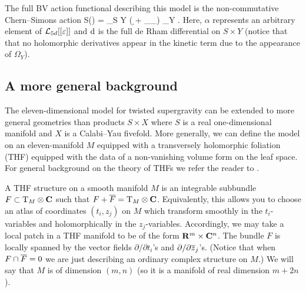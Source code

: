 The full BV action functional describing this model is the non-commutative Chern--Simons action
\beqn
S(\alpha) = \int_{S \times Y} \left( \alpha \d \alpha +  \alpha \star_\ep \alpha \star_\ep \alpha \right) \wedge \Omega_Y .
\eeqn
Here, $\alpha$ represents an arbitrary element of $\cL_{5d}[[\ep]]$ and $\d$ is the full de Rham differential on $S \times Y$ (notice that that no holomorphic derivatives appear in the kinetic term due to the appearance of $\Omega_Y$).


\subsection{A more general background}

The eleven-dimensional model for twisted supergravity can be extended to more general geometries than products $S \times X$ where $S$ is a real one-dimensional manifold and $X$ is a Calabi--Yau fivefold.
More generally, we can define the model on an eleven-manifold $M$ equipped with a transversely holomorphic foliation (THF) equipped with the data of a non-vanishing volume form on the leaf space.
For general background on the theory of THFs we refer the reader to \cite{DuchampKalka, KamberTondeur, Rawnsley}.

A THF structure on a smooth manifold $M$ is an integrable subbundle $F \subset \T_M \otimes \C$ such that $F + \Bar{F} = \T_M \otimes \C$.
Equivalently, this allows you to choose an atlas of coordinates $(t_i, z_j)$ on $M$ which transform smoothly in the $t_i$-variables and holomorphically in the $z_j$-variables. 
Accordingly, we may take a local patch in a THF manifold to be of the form $\R^m \times \C^n$.
The bundle $F$ is locally spanned by the vector fields $\partial / \partial t_i$'s and $\del/\del \zbar_j$'s.
(Notice that when $F \cap \Bar{F} = 0$ we are just describing an ordinary complex structure on $M$.)
We will say that $M$ is of dimension $(m,n)$ (so it is a manifold of real dimension $m + 2n$).

